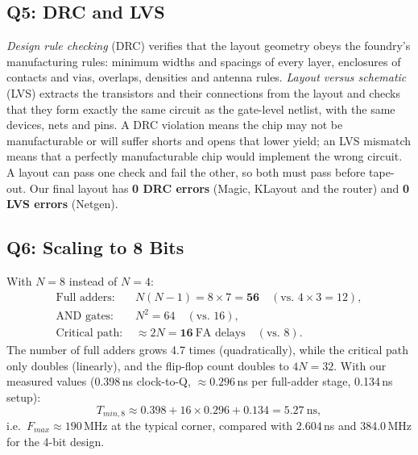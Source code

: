 \documentclass[conference]{IEEEtran}
\begin{document}
\subsection{Q5: DRC and LVS}
\emph{Design rule checking} (DRC) verifies that the layout geometry obeys the foundry's manufacturing rules:
minimum widths and spacings of every layer, enclosures of contacts and vias, overlaps, densities and antenna rules.
\emph{Layout versus schematic} (LVS) extracts the transistors and their connections from the layout and
checks that they form exactly the same circuit as the gate-level netlist, with the same devices, nets and
pins. A DRC violation means the chip may not be manufacturable or will suffer shorts and opens that lower
yield; an LVS mismatch means that a perfectly manufacturable chip would implement the wrong circuit. A
layout can pass one check and fail the other, so both must pass before tape-out. Our final layout has
\textbf{0 DRC errors} (Magic, KLayout and the router) and \textbf{0 LVS errors} (Netgen).

\subsection{Q6: Scaling to 8 Bits}
With $N = 8$ instead of $N = 4$:
\begin{align}
\text{Full adders: } & N(N-1) = 8\times7 = \mathbf{56} \quad (\text{vs. } 4\times3 = 12), \\
\text{AND gates: } & N^2 = 64 \quad (\text{vs. } 16), \\
\text{Critical path: } & \approx 2N = \mathbf{16}\ \text{FA delays} \quad (\text{vs. } 8).
\end{align}
The number of full adders grows 4.7 times (quadratically), while the critical path only doubles
(linearly), and the flip-flop count doubles to $4N = 32$. With our measured values (0.398\,ns clock-to-Q,
$\approx 0.296$\,ns per full-adder stage, 0.134\,ns setup):
\begin{equation}
T_{min,8} \approx 0.398 + 16\times0.296 + 0.134 = 5.27~\text{ns},
\end{equation}
i.e.\ $F_{max} \approx 190$\,MHz at the typical corner, compared with 2.604\,ns and 384.0\,MHz for the 4-bit
design.
\end{document}
